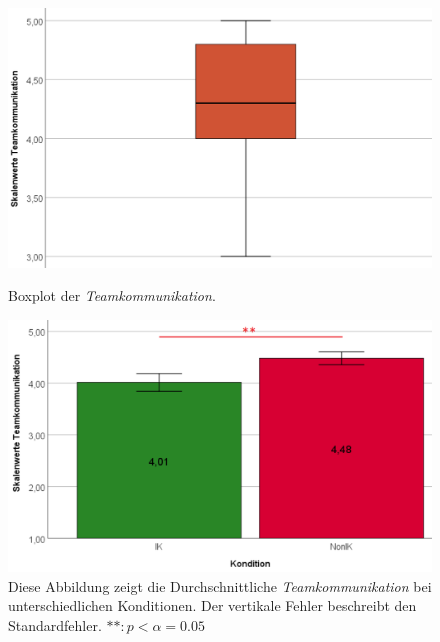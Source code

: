 \documentclass[a4paper,11pt]{article}%
\renewcommand{\\}{\vspace*{0.5\baselineskip} \newline}
\begin{document}
	\begin{figure}[H]
   \begin{minipage}[t]{.5\linewidth} %
      \includegraphics[width=\linewidth]{Abbildungen/AuswertungDiagramme/BP_Teamkommunikation.png}
      \caption[Boxplot der \textit{Teamkommunikation}]{Boxplot der \textit{Teamkommunikation}.}
            \label{SD_TeamkommunikationBP}
   \end{minipage}
   \hspace{.02\linewidth}%
   \begin{minipage}[t]{.5\linewidth} %
     \includegraphics[width=\linewidth]{Abbildungen/AuswertungDiagramme/SD_Teamkommunikation_Mittelwerte.png}
      \caption[Durchschnittliche \textit{Teamkommunikation}]{Diese Abbildung zeigt die Durchschnittliche \textit{Teamkommunikation} bei unterschiedlichen Konditionen. Der vertikale Fehler beschreibt den Standardfehler. $** : p < \alpha = 0.05$}
       \label{SD_Teamkommunikation_Mittelwerte}
   \end{minipage}
\end{figure}
\end{document}
